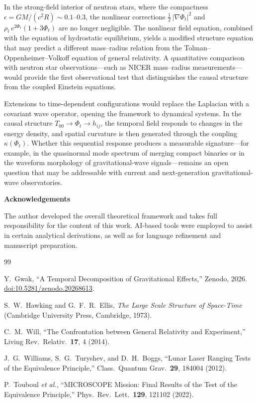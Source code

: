 \documentclass[12pt]{article}
\begin{document}
In the strong-field interior of neutron stars, where the compactness $\epsilon = GM/(c^2 R) \sim 0.1\text{--}0.3$, the nonlinear corrections $\frac{1}{2}\,|\nabla\Phi_t|^2$ and $\rho_t\,e^{2\Phi_t}(1+3\Phi_t)$ are no longer negligible. The nonlinear field equation, combined with the equation of hydrostatic equilibrium, yields a modified structure equation that may predict a different mass--radius relation from the Tolman--Oppenheimer--Volkoff equation of general relativity. A quantitative comparison with neutron star observations---such as NICER mass--radius measurements---would provide the first observational test that distinguishes the causal structure from the coupled Einstein equations.

Extensions to time-dependent configurations would replace the Laplacian with a covariant wave operator, opening the framework to dynamical systems. In the causal structure $T_{00} \to \Phi_t \to h_{ij}$, the temporal field responds to changes in the energy density, and spatial curvature is then generated through the coupling $\kappa(\Phi_t)$. Whether this sequential response produces a measurable signature---for example, in the quasinormal mode spectrum of merging compact binaries or in the waveform morphology of gravitational-wave signals---remains an open question that may be addressable with current and next-generation gravitational-wave observatories.


\vspace{1em}
\noindent\textbf{Acknowledgements}

\vspace{0.5em}
\noindent The author developed the overall theoretical framework and takes full responsibility for the content of this work. AI-based tools were employed to assist in certain analytical derivations, as well as for language refinement and manuscript preparation.


\begin{thebibliography}{99}

Y.~Gwak, ``A Temporal Decomposition of Gravitational Effects,'' Zenodo, 2026.
\href{https://doi.org/10.5281/zenodo.20268613}{doi:10.5281/zenodo.20268613}.

S.~W.~Hawking and G.~F.~R.~Ellis, \textit{The Large Scale Structure of Space-Time} (Cambridge University Press, Cambridge, 1973).

C.~M.~Will, ``The Confrontation between General Relativity and Experiment,''
Living Rev.~Relativ.~\textbf{17}, 4 (2014).

J.~G.~Williams, S.~G.~Turyshev, and D.~H.~Boggs, ``Lunar Laser Ranging Tests of the Equivalence Principle,''
Class.~Quantum Grav.~\textbf{29}, 184004 (2012).

P.~Touboul \emph{et al.}, ``MICROSCOPE Mission: Final Results of the Test of the Equivalence Principle,''
Phys.~Rev.~Lett.~\textbf{129}, 121102 (2022).

\end{thebibliography}
\end{document}
